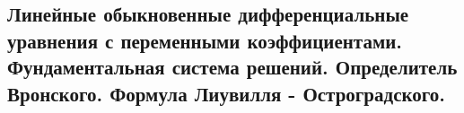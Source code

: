\subsection{Линейные обыкновенные дифференциальные уравнения с переменными коэффициентами. Фундаментальная система решений. Определитель Вронского. Формула Лиувилля - Остроградского.}
